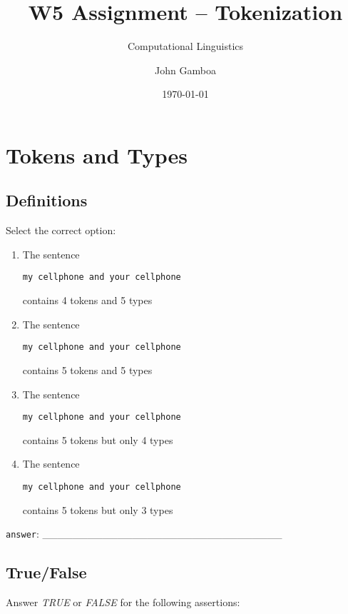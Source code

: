 \documentclass[a4paper,11pt]{scrartcl}
\title{W5 Assignment -- Tokenization}
\subtitle{Computational Linguistics}
\author{John Gamboa}
\date{\today}
\begin{document}
\maketitle

\section{Tokens and Types}

\subsection{Definitions}

Select the correct option:

\begin{enumerate}[label=\alph*)]
\singlespacing
\item The sentence
\begin{verbatim}
my cellphone and your cellphone
\end{verbatim}
contains 4 tokens and 5 types

\item The sentence
\begin{verbatim}
my cellphone and your cellphone
\end{verbatim}
contains 5 tokens and 5 types

\item The sentence
\begin{verbatim}
my cellphone and your cellphone
\end{verbatim}
contains 5 tokens but only 4 types

\item The sentence
\begin{verbatim}
my cellphone and your cellphone
\end{verbatim}
contains 5 tokens but only 3 types

\end{enumerate}

\verb|answer|: \_\_\_\_\_\_\_\_\_\_\_\_\_\_\_\_\_\_\_\_\_\_\_\_\_\_\_\_\_\_\_\_


\subsection{True/False}

Answer \textit{TRUE} or \textit{FALSE} for the following assertions:
\end{document}
